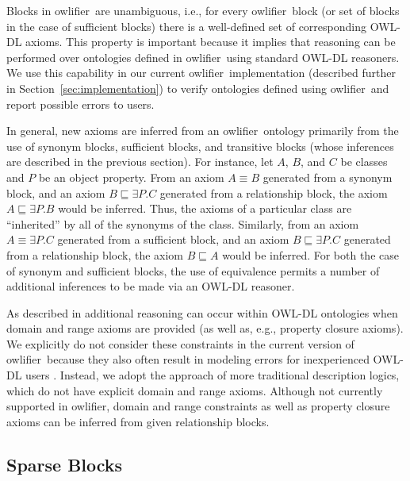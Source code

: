 \documentclass[5p,authoryear]{elsarticle}
\newcommand{\owlifier}{\textsf{owlifier}}
\newcommand{\secref}[1]{Section~\ref{#1}}
\begin{document}
Blocks in \owlifier\ are unambiguous, i.e., for every \owlifier\ block
(or set of blocks in the case of sufficient blocks) there is a
well-defined set of corresponding OWL-DL axioms. This property is
important because it implies that reasoning can be performed over
ontologies defined in \owlifier\ using standard OWL-DL reasoners.  We
use this capability in our current \owlifier\ implementation
(described further in \secref{sec:implementation}) to verify
ontologies defined using \owlifier\ and report possible errors to
users.

In general, new axioms are inferred from an \owlifier\ ontology
primarily from the use of synonym blocks, sufficient blocks, and
transitive blocks (whose inferences are described in the previous
section). For instance, let $A$, $B$, and $C$ be classes and $P$ be an
object property. From an axiom $A \equiv B$ generated from a synonym
block, and an axiom $B \sqsubseteq \exists P.C$ generated from a
relationship block, the axiom $A \sqsubseteq \exists P.B$ would be
inferred. Thus, the axioms of a particular class are ``inherited'' by
all of the synonyms of the class. Similarly, from an axiom $A \equiv
\exists P. C$ generated from a sufficient block, and an axiom $B
\sqsubseteq \exists P.C$ generated from a relationship block, the
axiom $B \sqsubseteq A$ would be inferred. For both the case of
synonym and sufficient blocks, the use of equivalence permits a number
of additional inferences to be made via an OWL-DL reasoner.

As described in \citep{rector04:_owl_pizzas} additional reasoning can
occur within OWL-DL ontologies when domain and range axioms are
provided (as well as, e.g., property closure axioms).  We explicitly
do not consider these constraints in the current version of
\owlifier\ because they also often result in modeling errors for
inexperienced OWL-DL users \citep{rector04:_owl_pizzas}. Instead, we
adopt the approach of more traditional description logics, which do
not have explicit domain and range axioms.  Although not currently
supported in \owlifier, domain and range constraints as well as
property closure axioms can be inferred from given relationship
blocks.

\subsection{Sparse Blocks} 
\end{document}
